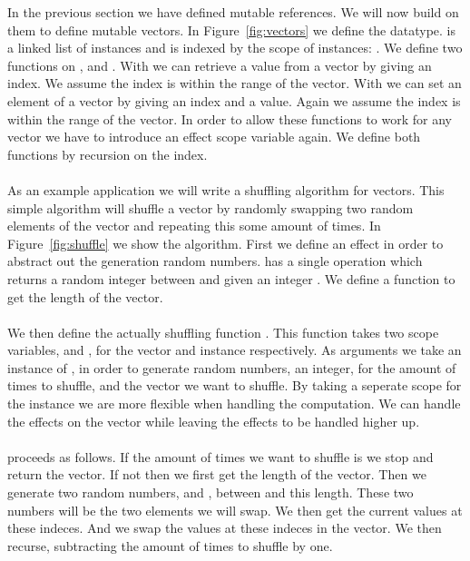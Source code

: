 In the previous section we have defined mutable references.
We will now build on them to define mutable vectors.
In Figure~\ref{fig:vectors} we define the  datatype.
 is a linked list of  instances and is indexed by the scope of instances: .
We define two functions on ,  and .
With  we can retrieve a value from a vector by giving an index.
We assume the index is within the range of the vector.
With  we can set an element of a vector by giving an index and a value.
Again we assume the index is within the range of the vector.
In order to allow these functions to work for any vector we have to introduce an effect scope variable  again.
We define both functions by recursion on the index.
\\\\
As an example application we will write a shuffling algorithm for vectors.
This simple algorithm will shuffle a vector by randomly swapping two random elements of the vector and repeating this some amount of times.
In Figure~\ref{fig:shuffle} we show the algorithm.
First we define an effect  in order to abstract out the generation random numbers.
 has a single operation  which returns a random integer between  and  given an integer .
We define a function  to get the length of the vector.
\\\\
We then define the actually shuffling function .
This function takes two scope variables,  and , for the vector and  instance respectively.
As arguments we take an instance of , in order to generate random numbers, an integer, for the amount of times to shuffle, and the vector we want to shuffle.
By taking a seperate scope for the  instance we are more flexible when handling the computation.
We can handle the effects on the vector while leaving the  effects to be handled higher up.
\\\\
 proceeds as follows.
If the amount of times we want to shuffle is  we stop and return the vector.
If not then we first get the length of the vector.
Then we generate two random numbers,  and , between  and this length.
These two numbers will be the two elements we will swap.
We then get the current values at these indeces.
And we swap the values at these indeces in the vector.
We then recurse, subtracting the amount of times to shuffle by one.

